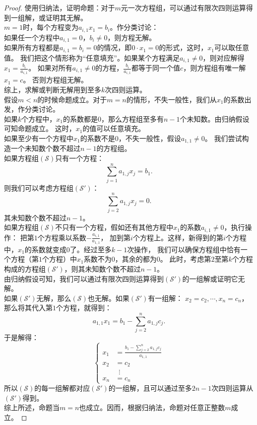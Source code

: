 \documentclass[12pt,UTF8,fontset=none]{ctexbook}
\begin{document}
\begin{proof} %
使用归纳法，证明命题：对于$m$元一次方程组，可以通过有限次四则运算得到一组解，或证明其无解。\\
$m=1$时，每个方程变为$a_{i,1} x_1 = b_{i}$。作分类讨论：\\
如果任一个方程中$a_{i,1} = 0$，$b_{i} \neq 0$，则方程无解。\\
如果所有方程都是$a_{i,1} = b_{i} = 0$的情况，即$0\cdot x_1 = 0$的形式，这时，$x_1$可以取任意值。
我们把这个情形称为“任意填充”。如果某个方程满足$a_{i,1} \neq 0$，则对应解得$x_1 = \frac{b_{i}}{a_{i,1}} $。
如果对所有$a_{i,1} \neq 0$的方程，$\frac{b_{i}}{a_{i,1}}$都等于同一个值$c$，则方程组有唯一解$x_1 = c $。
否则方程组无解。\\
综上，求解或判断无解用到至多$k$次四则运算。\\
假设$m < n$的时候命题成立。对于$m = n$的情形，不失一般性，我们从$x_1$的系数出发，作分类讨论。\\
如果$k$个方程中，$x_1$的系数都是$0$，那么方程组至多有$n-1$个未知数。由归纳假设可知命题成立。
这时，$x_1$的值可以任意填充。\\
如果至少有一个方程中$x_1$的系数不是$0$，不失一般性，假设$a_{1,1} \neq 0$。
我们尝试构造一个未知数个数不超过$n-1$的方程组。\\
如果方程组$(\mathcal{S})$只有一个方程：
$$ \sum_{j=1}^n a_{1,j} x_j = b_{1}. $$
则我们可以考虑方程组$(\mathcal{S}')$：
$$ \sum_{j=2}^n a_{1,j} x_j = 0. $$
其未知数个数不超过$n-1$。\\
如果方程组$(\mathcal{S})$不只有一个方程，假如还有其他方程中$x_1$的系数$a_{i,1} \neq 0$，执行操作：
把第$1$个方程乘以系数$-\frac{a_{i,1}}{a_{1,1}}$，
加到第$i$个方程上。这样，新得到的第$i$个方程中，$x_1$的系数就变成$0$了。经过至多$k-1$次操作，
我们可以确保方程组中恰有一个方程（第$1$个方程）中$x_1$系数不为$0$，其余的都为$0$。
此时，考虑第$2$至第$k$个方程构成的方程组$(\mathcal{S}')$，则其未知数个数不超过$n-1$。\\
由归纳假设可知，我们可以通过有限次四则运算得到$(\mathcal{S}')$的一组解或证明它无解。\\
如果$(\mathcal{S}')$无解，那么$(\mathcal{S})$也无解。如果$(\mathcal{S}')$有一组解：
$x_2 = c_2, \cdots , x_n = c_n$，那么将其代入第$1$个方程，就得到：
$$ a_{1,1} x_1 = b_{1} - \sum_{j=2}^n a_{1,j} c_j. $$
于是解得：
$$ \left\{
    \begin{array}{rl}
    x_1 &= \frac{b_{1} - \sum_{j=2}^n a_{1,j} c_j}{a_{1,1}} \\
    x_2 &= c_2  \\
     \quad & \,\,\,\vdots   \\
    x_n &= c_n 
    \end{array}
\right.$$
所以$(\mathcal{S})$的每一组解都对应$(\mathcal{S}')$的一组解，且可以通过至多$2n-1$次四则运算从$(\mathcal{S}')$得到。\\
综上所述，命题当$m = n$也成立。因而，根据归纳法，命题对任意正整数$m$成立。

\end{proof}
\end{document}
